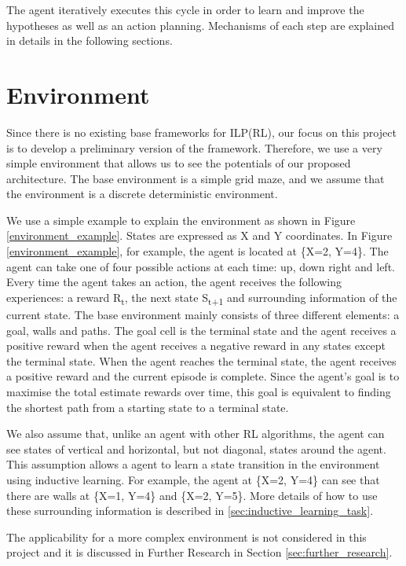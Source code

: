 The agent iteratively executes this cycle in order to learn and improve the hypotheses as well as an action planning. 
Mechanisms of each step are explained in details in the following sections.

\section{Environment}
\label{sec:environment}
Since there is no existing base frameworks for ILP(RL), our focus on this project is to develop a preliminary version of the framework. 
Therefore, we use a very simple environment that allows us to see the potentials of our proposed architecture.
The base environment is a simple grid maze, and we assume that the environment is a discrete deterministic environment. 

We use a simple example to explain the environment as shown in Figure \ref{environment_example}.
States are expressed as X and Y coordinates. In Figure \ref{environment_example}, for example, the agent is located at \{X=2, Y=4\}.
The agent can take one of four possible actions at each time: up, down right and left.
Every time the agent takes an action, the agent receives the following experiences: a reward R\textsubscript{t}, the next state S\textsubscript{t+1} and surrounding information of the current state.
The base environment mainly consists of three different elements: a goal, walls and paths.
The goal cell is the terminal state and the agent receives a positive reward when the agent receives a negative reward in any states except the terminal state.
When the agent reaches the terminal state, the agent receives a positive reward and the current episode is complete. 
Since the agent's goal is to maximise the total estimate rewards over time, this goal is equivalent to finding the shortest path from a starting state to a terminal state.

We also assume that, unlike an agent with other RL algorithms, the agent can see states of vertical and horizontal, but not diagonal, states around the agent. 
This assumption allows a agent to learn a state transition in the environment using inductive learning. For example, the agent at \{X=2, Y=4\} can see that there are walls at \{X=1, Y=4\} and \{X=2, Y=5\}.
More details of how to use these surrounding information is described in \ref{sec:inductive_learning_task}.

The applicability for a more complex environment is not considered in this project and it is discussed in Further Research in Section \ref{sec:further_research}.

